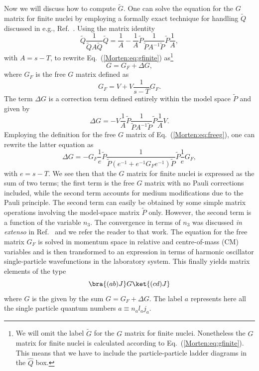 Now we will discuss how to compute $\tilde{G}$. 
One can solve the equation for the $G$ matrix
for finite nuclei by employing
a formally
exact technique for handling $\tilde{Q}$
discussed in e.g., Ref.~.
Using the matrix identity
\begin{equation}
  \tilde{Q}\frac{1}{\tilde{Q}A\tilde{Q}}
  \tilde{Q}=\frac{1}{A}-
   \frac{1}{A}\tilde{P}\frac{1}{\tilde{P}A^{-1}\tilde{P}}\tilde{P}\frac{1}{A},
   \label{Morten:eq:matrix_relation_q}
\end{equation}
with $A=s -T$, to rewrite Eq.~(\ref{Morten:eq:gfinite}) 
as\footnote{We will omit the
label $\tilde{G}$ for the $G$ matrix for finite nuclei. Nonetheless
 the $G$ matrix for finite nuclei is calculated according
to Eq.~(\ref{Morten:eq:gfinite}). This means that we have to 
include the particle-particle ladder diagrams in the 
$\hat{Q}$ box. }
\begin{equation}
   G = G_{F} +\Delta G,\label{Morten:eq:gmod}
\end{equation}
where $G_{F}$ is the free $G$ matrix defined as
\begin{equation}
   G_{F}=V+V\frac{1}{s - T}G_{F}. \label{Morten:eq:freeg}
\end{equation}
The term $\Delta G$ is a correction term defined entirely within the
model space $\tilde{P}$ and given by
\begin{equation}
   \Delta G =-V\frac{1}{A}\tilde{P}
   \frac{1}{\tilde{P}A^{-1}\tilde{P}}\tilde{P}\frac{1}{A}V.
\end{equation}
Employing the definition for the free $G$ matrix of Eq.~(\ref{Morten:eq:freeg}),
one can rewrite the latter equation as
\begin{equation}
  \Delta G =-G_{F}\frac{1}{e}\tilde{P}
  \frac{1}{\tilde{P}(e^{-1}+e^{-1}G_{F}e^{-1})
  \tilde{P}}\tilde{P}\frac{1}{e}G_F,
\end{equation}
with $e=s -T$.  We see then that the $G$ matrix for finite nuclei is
expressed as the sum of two terms; the first term is the free $G$
matrix with no Pauli corrections included, while the second term
accounts for medium modifications due to the Pauli principle. The
second term can easily be obtained by some simple matrix operations
involving the model-space matrix $\tilde{P}$ only.  However, the
second term is a function of the variable $n_3$. The convergence in
terms of $n_3$ was discussed \emph{in extenso} in
Ref.~ and we refer the reader to that work.  The
equation for the free matrix $G_F$ is solved in momentum space in
relative and centre-of-mass (CM) variables and is then
transformed to an expression in terms of harmonic oscillator
single-particle wavefunctions in the laboratory system. This finally
yields matrix elements of the type
\begin{equation}
  \bra{(ab)J}G\ket{(cd)J}
\end{equation}
where $G$ is the given by the sum $G = G_{F} +\Delta G$.
The label $a$ represents here all the single particle quantum numbers
$a\equiv n_{a}l_{a}j_{a}$.

